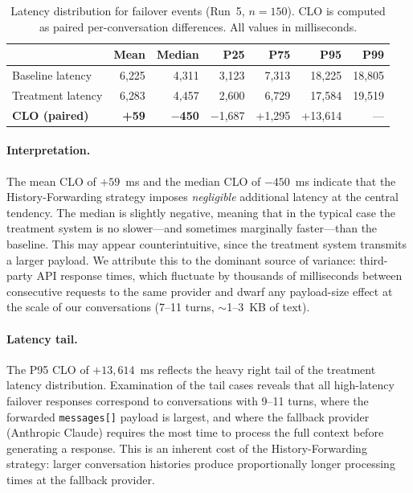 \begin{table}[t]
\centering
\caption{Latency distribution for failover events (Run~5, $n = 150$). CLO is computed as paired per-conversation differences. All values in milliseconds.}
\label{tab:clo}
\small
\begin{tabular}{lrrrrrr}
\toprule
 & \textbf{Mean} & \textbf{Median} & \textbf{P25} & \textbf{P75} & \textbf{P95} & \textbf{P99} \\
\midrule
Baseline latency  & 6{,}225 & 4{,}311 & 3{,}123 & 7{,}313 & 18{,}225 & 18{,}805 \\
Treatment latency & 6{,}283 & 4{,}457 & 2{,}600 & 6{,}729 & 17{,}584 & 19{,}519 \\
\midrule
\textbf{CLO (paired)} & \textbf{+59} & \textbf{$-$450} & $-$1{,}687 & +1{,}295 & +13{,}614 & --- \\
\bottomrule
\end{tabular}
\end{table}

\paragraph{Interpretation.}
The mean CLO of $+59$~ms and the median CLO of $-450$~ms indicate that the History-Forwarding strategy imposes \textit{negligible} additional latency at the central tendency. The median is slightly negative, meaning that in the typical case the treatment system is no slower---and sometimes marginally faster---than the baseline. This may appear counterintuitive, since the treatment system transmits a larger payload. We attribute this to the dominant source of variance: third-party API response times, which fluctuate by thousands of milliseconds between consecutive requests to the same provider and dwarf any payload-size effect at the scale of our conversations (7--11 turns, $\sim$1--3~KB of text).

\paragraph{Latency tail.}
The P95 CLO of $+13{,}614$~ms reflects the heavy right tail of the treatment latency distribution. Examination of the tail cases reveals that all high-latency failover responses correspond to conversations with 9--11 turns, where the forwarded \texttt{messages[]} payload is largest, and where the fallback provider (Anthropic Claude) requires the most time to process the full context before generating a response. This is an inherent cost of the History-Forwarding strategy: larger conversation histories produce proportionally longer processing times at the fallback provider.


